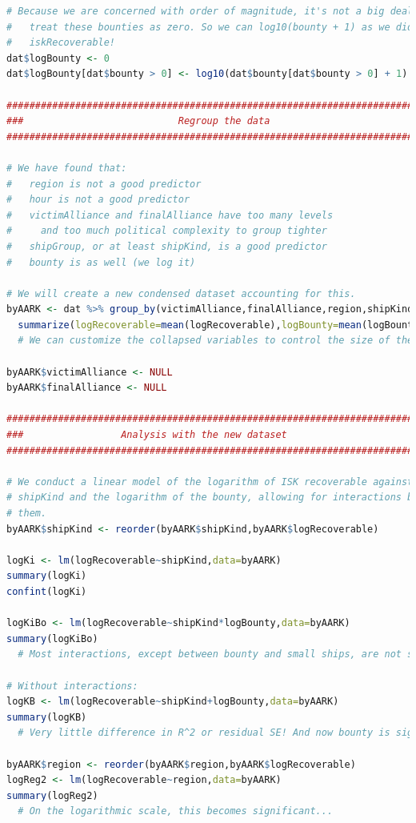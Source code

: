 \documentclass[letterpaper,12pt,article]{memoir}
\begin{document}
{\begin{lstlisting}[language=R]
# Because we are concerned with order of magnitude, it's not a big deal to
#   treat these bounties as zero. So we can log10(bounty + 1) as we did with
#   iskRecoverable!
dat$logBounty <- 0
dat$logBounty[dat$bounty > 0] <- log10(dat$bounty[dat$bounty > 0] + 1)

###############################################################################
###                           Regroup the data                              ###
###############################################################################

# We have found that:
#   region is not a good predictor
#   hour is not a good predictor
#   victimAlliance and finalAlliance have too many levels
#     and too much political complexity to group tighter
#   shipGroup, or at least shipKind, is a good predictor
#   bounty is as well (we log it)

# We will create a new condensed dataset accounting for this.
byAARK <- dat %>% group_by(victimAlliance,finalAlliance,region,shipKind) %>% 
  summarize(logRecoverable=mean(logRecoverable),logBounty=mean(logBounty))
  # We can customize the collapsed variables to control the size of the data

byAARK$victimAlliance <- NULL
byAARK$finalAlliance <- NULL

###############################################################################
###                 Analysis with the new dataset                           ###
###############################################################################

# We conduct a linear model of the logarithm of ISK recoverable against the 
# shipKind and the logarithm of the bounty, allowing for interactions between
# them.
byAARK$shipKind <- reorder(byAARK$shipKind,byAARK$logRecoverable)

logKi <- lm(logRecoverable~shipKind,data=byAARK)
summary(logKi)
confint(logKi)

logKiBo <- lm(logRecoverable~shipKind*logBounty,data=byAARK)
summary(logKiBo)
  # Most interactions, except between bounty and small ships, are not sig.

# Without interactions:
logKB <- lm(logRecoverable~shipKind+logBounty,data=byAARK)
summary(logKB)
  # Very little difference in R^2 or residual SE! And now bounty is sig.

byAARK$region <- reorder(byAARK$region,byAARK$logRecoverable)
logReg2 <- lm(logRecoverable~region,data=byAARK)
summary(logReg2)
  # On the logarithmic scale, this becomes significant...


\end{lstlisting}}
\end{document}
